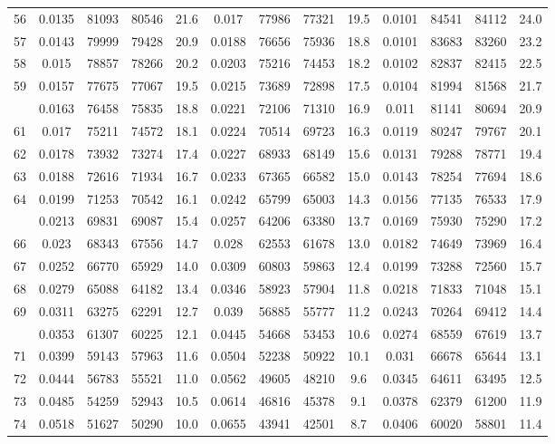\documentclass[
  14pt,
]{article}
\begin{document}
\begin{longtable}[t]{lcccccccccccc}
56 & 0.0135 & 81093 & 80546 & 21.6 & 0.017 & 77986 & 77321 & 19.5 & 0.0101 & 84541 & 84112 & 24.0\\
57 & 0.0143 & 79999 & 79428 & 20.9 & 0.0188 & 76656 & 75936 & 18.8 & 0.0101 & 83683 & 83260 & 23.2\\
58 & 0.015 & 78857 & 78266 & 20.2 & 0.0203 & 75216 & 74453 & 18.2 & 0.0102 & 82837 & 82415 & 22.5\\
59 & 0.0157 & 77675 & 77067 & 19.5 & 0.0215 & 73689 & 72898 & 17.5 & 0.0104 & 81994 & 81568 & 21.7\\
\addlinespace
60 & 0.0163 & 76458 & 75835 & 18.8 & 0.0221 & 72106 & 71310 & 16.9 & 0.011 & 81141 & 80694 & 20.9\\
61 & 0.017 & 75211 & 74572 & 18.1 & 0.0224 & 70514 & 69723 & 16.3 & 0.0119 & 80247 & 79767 & 20.1\\
62 & 0.0178 & 73932 & 73274 & 17.4 & 0.0227 & 68933 & 68149 & 15.6 & 0.0131 & 79288 & 78771 & 19.4\\
63 & 0.0188 & 72616 & 71934 & 16.7 & 0.0233 & 67365 & 66582 & 15.0 & 0.0143 & 78254 & 77694 & 18.6\\
64 & 0.0199 & 71253 & 70542 & 16.1 & 0.0242 & 65799 & 65003 & 14.3 & 0.0156 & 77135 & 76533 & 17.9\\
\addlinespace
65 & 0.0213 & 69831 & 69087 & 15.4 & 0.0257 & 64206 & 63380 & 13.7 & 0.0169 & 75930 & 75290 & 17.2\\
66 & 0.023 & 68343 & 67556 & 14.7 & 0.028 & 62553 & 61678 & 13.0 & 0.0182 & 74649 & 73969 & 16.4\\
67 & 0.0252 & 66770 & 65929 & 14.0 & 0.0309 & 60803 & 59863 & 12.4 & 0.0199 & 73288 & 72560 & 15.7\\
68 & 0.0279 & 65088 & 64182 & 13.4 & 0.0346 & 58923 & 57904 & 11.8 & 0.0218 & 71833 & 71048 & 15.1\\
69 & 0.0311 & 63275 & 62291 & 12.7 & 0.039 & 56885 & 55777 & 11.2 & 0.0243 & 70264 & 69412 & 14.4\\
\addlinespace
70 & 0.0353 & 61307 & 60225 & 12.1 & 0.0445 & 54668 & 53453 & 10.6 & 0.0274 & 68559 & 67619 & 13.7\\
71 & 0.0399 & 59143 & 57963 & 11.6 & 0.0504 & 52238 & 50922 & 10.1 & 0.031 & 66678 & 65644 & 13.1\\
72 & 0.0444 & 56783 & 55521 & 11.0 & 0.0562 & 49605 & 48210 & 9.6 & 0.0345 & 64611 & 63495 & 12.5\\
73 & 0.0485 & 54259 & 52943 & 10.5 & 0.0614 & 46816 & 45378 & 9.1 & 0.0378 & 62379 & 61200 & 11.9\\
74 & 0.0518 & 51627 & 50290 & 10.0 & 0.0655 & 43941 & 42501 & 8.7 & 0.0406 & 60020 & 58801 & 11.4\\

\end{longtable}
\end{document}
